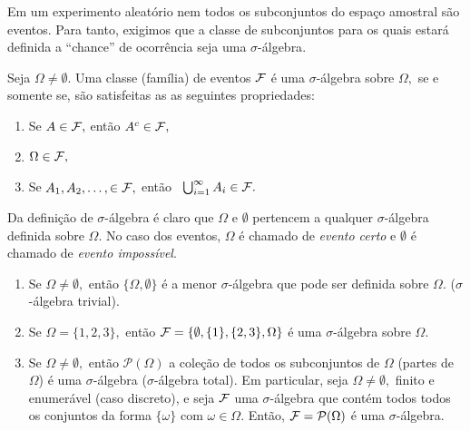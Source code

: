 \begin{frame}
Em um experimento aleatório nem  todos os subconjuntos do espaço amostral são eventos. Para
tanto, exigimos que a classe de subconjuntos para os quais estará definida a
``chance'' de ocorrência seja uma {$\sigma$-álgebra}.

\begin{defi}
Seja $\Omega\neq \emptyset.$  Uma classe (família) de eventos ${\cal F}$  é uma {$\sigma$-álgebra} sobre $\Omega,$  se e somente se, são satisfeitas as 
as seguintes propriedades: 
\begin{enumerate}

\item Se $A\in{\cal F},$ então $A^c\in{\cal
F},$  
\item $\Omega \in {\cal F},$ 
\item  Se $A_1, A_2, \ldots, \in {\cal F},$ 
então \ $\bigcup_{i=1}^\infty A_i \in {\cal F}.$ 
\end{enumerate}
\end{defi}

Da definição de  $\sigma$-álgebra é claro que $\Omega$ e $\emptyset$ pertencem a qualquer $\sigma$-álgebra definida sobre $\Omega.$
No caso dos eventos,  $\Omega$ é chamado de {\it evento certo} e $\emptyset$ é chamado de {\it evento impossível}.

\begin{exem}
\begin{enumerate}
\item  Se $\Omega\neq \emptyset,$ então $\{\Omega, \emptyset \}$ é a menor
$\sigma$-álgebra que pode ser definida sobre $\Omega.$  ($\sigma$-álgebra trivial). 

\item Se $\Omega  = \{ 1, 2, 3 \},$ então ${\cal F} = \{  \emptyset, \{ 1 \}, \{ 2, 3 \}, \Omega \} $ é uma $\sigma$-álgebra sobre $\Omega.$ 

\item  Se $\Omega\neq \emptyset,$ então $ \mathcal{P}(\Omega )$ a coleção de todos os subconjuntos de $\Omega$ (partes de $\Omega$) é uma $\sigma$-álgebra ($\sigma$-álgebra total). Em particular, seja $\Omega\neq \emptyset,$ finito e enumerável (caso discreto), e seja ${\cal F}$ uma 
$\sigma$-álgebra que contém todos todos os conjuntos da forma $\{ \omega \}$ com $\omega \in \Omega.$ Então, 
${\cal F} = \mathcal{P}(\Omega )$ é uma $\sigma$-álgebra.



 \end{enumerate} 
\end{exem} 
 

\end{frame}

